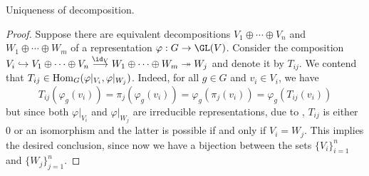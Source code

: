 \begin{theorem}
    Uniqueness of decomposition.
\end{theorem}
\begin{proof}
    Suppose there are equivalent decompositions $V_1\oplus\cdots\oplus V_n$ and $W_1\oplus\cdots\oplus W_m$ of a representation $\varphi: G\to\GL(V)$. Consider the composition $V_i\hookrightarrow V_1\oplus\cdots\oplus V_n\stackrel{\id_V}{\longrightarrow}W_1\oplus\cdots\oplus W_m\twoheadrightarrow W_j$ and denote it by $T_{ij}$. We contend that $T_{ij}\in\operatorname{Hom}_G(\varphi|_{V_i},\varphi|_{W_j})$. Indeed, for all $g\in G$ and $v_i\in V_i$, we have 
    \begin{equation*}
        T_{ij}(\varphi_g(v_i)) = \pi_j(\varphi_g(v_i)) = \varphi_g(\pi_j(v_i)) = \varphi_g(T_{ij}(v_i))
    \end{equation*}
    but since both $\varphi|_{V_i}$ and $\varphi|_{W_j}$ are irreducible representations, due to , $T_{ij}$ is either $0$ or an isomorphism and the latter is possible if and only if $V_i = W_j$. This implies the desired conclusion, since now we have a bijection between the sets $\{V_i\}_{i = 1}^n$ and $\{W_j\}_{j = 1}^n$.
\end{proof}